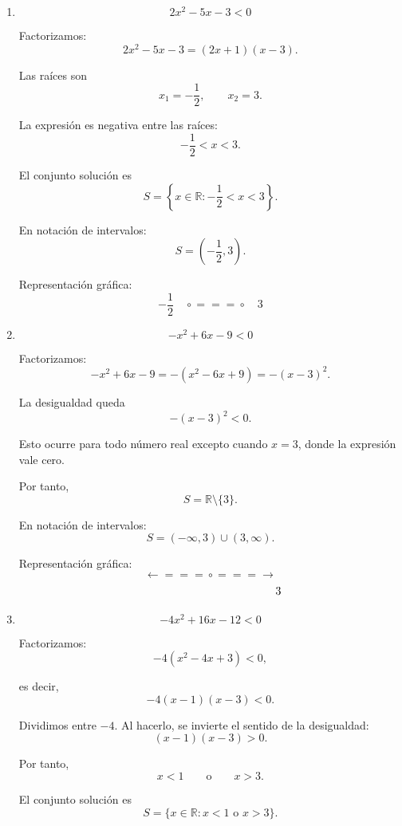 \documentclass[12pt]{article}
\begin{document}
{\begin{enumerate}
El conjunto solución es
\[
\boxed{
S=\{x\in\mathbb{R}:1<x<3\}.
}
\]

En notación de intervalos:
\[
\boxed{
S=(1,3).
}
\]

Representación gráfica:
\[
1\quad
\circ\!\!=\!\!=\!\!=\!\circ
\quad3
\]

\item
\[
2x^2-5x-3<0
\]

Factorizamos:
\[
2x^2-5x-3=(2x+1)(x-3).
\]

Las raíces son
\[
x_1=-\frac{1}{2},
\qquad
x_2=3.
\]

La expresión es negativa entre las raíces:
\[
-\frac{1}{2}<x<3.
\]

El conjunto solución es
\[
\boxed{
S=
\left\{
x\in\mathbb{R}:
-\frac{1}{2}<x<3
\right\}.
}
\]

En notación de intervalos:
\[
\boxed{
S=
\left(-\frac{1}{2},3\right).
}
\]

Representación gráfica:
\[
-\frac{1}{2}\quad
\circ\!\!=\!\!=\!\!=\!\circ
\quad3
\]

\item
\[
-x^2+6x-9<0
\]

Factorizamos:
\[
-x^2+6x-9
=
-(x^2-6x+9)
=
-(x-3)^2.
\]

La desigualdad queda
\[
-(x-3)^2<0.
\]

Esto ocurre para todo número real excepto cuando \(x=3\), donde la
expresión vale cero.

Por tanto,
\[
\boxed{
S=\mathbb{R}\setminus\{3\}.
}
\]

En notación de intervalos:
\[
\boxed{
S=(-\infty,3)\cup(3,\infty).
}
\]

Representación gráfica:
\[
\longleftarrow\!\!=\!\!=\!\!=\!\circ\!\!=\!\!=\!\!=\!\longrightarrow
\]
\[
\hspace{4.3cm}3
\]

\item
\[
-4x^2+16x-12<0
\]

Factorizamos:
\[
-4(x^2-4x+3)<0,
\]

es decir,
\[
-4(x-1)(x-3)<0.
\]

Dividimos entre \(-4\). Al hacerlo, se invierte el sentido de la
desigualdad:
\[
(x-1)(x-3)>0.
\]

Por tanto,
\[
x<1
\qquad\text{o}\qquad
x>3.
\]

El conjunto solución es
\[
\boxed{
S=
\{x\in\mathbb{R}:x<1\text{ o }x>3\}.
}
\]


\end{enumerate}}
\end{document}
